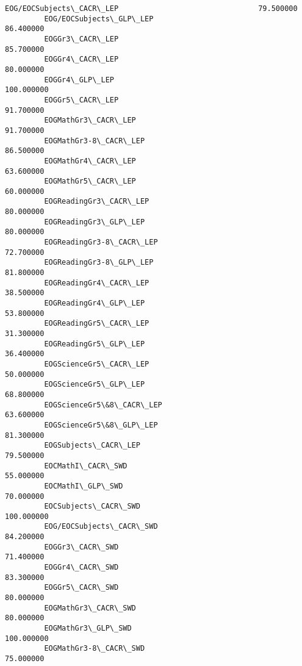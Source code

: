 \documentclass[11pt]{article}
\begin{document}
\begin{Verbatim}[commandchars=\\\{\}]
         EOG/EOCSubjects\_CACR\_LEP                                79.500000  
         EOG/EOCSubjects\_GLP\_LEP                                 86.400000  
         EOGGr3\_CACR\_LEP                                         85.700000  
         EOGGr4\_CACR\_LEP                                         80.000000  
         EOGGr4\_GLP\_LEP                                         100.000000  
         EOGGr5\_CACR\_LEP                                         91.700000  
         EOGMathGr3\_CACR\_LEP                                     91.700000  
         EOGMathGr3-8\_CACR\_LEP                                   86.500000  
         EOGMathGr4\_CACR\_LEP                                     63.600000  
         EOGMathGr5\_CACR\_LEP                                     60.000000  
         EOGReadingGr3\_CACR\_LEP                                  80.000000  
         EOGReadingGr3\_GLP\_LEP                                   80.000000  
         EOGReadingGr3-8\_CACR\_LEP                                72.700000  
         EOGReadingGr3-8\_GLP\_LEP                                 81.800000  
         EOGReadingGr4\_CACR\_LEP                                  38.500000  
         EOGReadingGr4\_GLP\_LEP                                   53.800000  
         EOGReadingGr5\_CACR\_LEP                                  31.300000  
         EOGReadingGr5\_GLP\_LEP                                   36.400000  
         EOGScienceGr5\_CACR\_LEP                                  50.000000  
         EOGScienceGr5\_GLP\_LEP                                   68.800000  
         EOGScienceGr5\&8\_CACR\_LEP                                63.600000  
         EOGScienceGr5\&8\_GLP\_LEP                                 81.300000  
         EOGSubjects\_CACR\_LEP                                    79.500000  
         EOCMathI\_CACR\_SWD                                       55.000000  
         EOCMathI\_GLP\_SWD                                        70.000000  
         EOCSubjects\_CACR\_SWD                                   100.000000  
         EOG/EOCSubjects\_CACR\_SWD                                84.200000  
         EOGGr3\_CACR\_SWD                                         71.400000  
         EOGGr4\_CACR\_SWD                                         83.300000  
         EOGGr5\_CACR\_SWD                                         80.000000  
         EOGMathGr3\_CACR\_SWD                                     80.000000  
         EOGMathGr3\_GLP\_SWD                                     100.000000  
         EOGMathGr3-8\_CACR\_SWD                                   75.000000  

\end{Verbatim}
\end{document}
